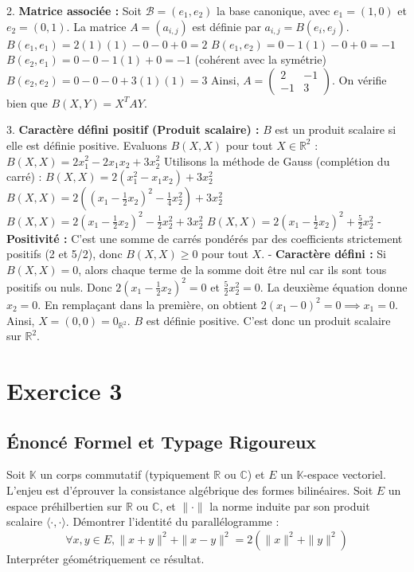 \documentclass[11pt,a4paper]{report}
\begin{document}
2. \textbf{Matrice associée :}
   Soit $\mathcal{B} = (e_1, e_2)$ la base canonique, avec $e_1 = (1, 0)$ et $e_2 = (0, 1)$.
   La matrice $A = (a_{i,j})$ est définie par $a_{i,j} = B(e_i, e_j)$.
   $B(e_1, e_1) = 2(1)(1) - 0 - 0 + 0 = 2$
   $B(e_1, e_2) = 0 - 1(1) - 0 + 0 = -1$
   $B(e_2, e_1) = 0 - 0 - 1(1) + 0 = -1$ (cohérent avec la symétrie)
   $B(e_2, e_2) = 0 - 0 - 0 + 3(1)(1) = 3$
   Ainsi, $A = \begin{pmatrix} 2 & -1 \\ -1 & 3 \end{pmatrix}$.
   On vérifie bien que $B(X, Y) = X^T A Y$.

3. \textbf{Caractère défini positif (Produit scalaire) :}
   $B$ est un produit scalaire si elle est définie positive. Evaluons $B(X, X)$ pour tout $X \in \mathbb{R}^2$ :
   $B(X, X) = 2x_1^2 - 2x_1x_2 + 3x_2^2$
   Utilisons la méthode de Gauss (complétion du carré) :
   $B(X, X) = 2(x_1^2 - x_1x_2) + 3x_2^2$
   $B(X, X) = 2( (x_1 - \frac{1}{2}x_2)^2 - \frac{1}{4}x_2^2 ) + 3x_2^2$
   $B(X, X) = 2(x_1 - \frac{1}{2}x_2)^2 - \frac{1}{2}x_2^2 + 3x_2^2$
   $B(X, X) = 2(x_1 - \frac{1}{2}x_2)^2 + \frac{5}{2}x_2^2$
   - \textbf{Positivité :} C'est une somme de carrés pondérés par des coefficients strictement positifs (2 et 5/2), donc $B(X, X) \ge 0$ pour tout $X$.
   - \textbf{Caractère défini :} Si $B(X, X) = 0$, alors chaque terme de la somme doit être nul car ils sont tous positifs ou nuls.
     Donc $2(x_1 - \frac{1}{2}x_2)^2 = 0$ et $\frac{5}{2}x_2^2 = 0$.
     La deuxième équation donne $x_2 = 0$.
     En remplaçant dans la première, on obtient $2(x_1 - 0)^2 = 0 \implies x_1 = 0$.
     Ainsi, $X = (0, 0) = 0_{\mathbb{R}^2}$.
   $B$ est définie positive. C'est donc un produit scalaire sur $\mathbb{R}^2$.


\section{Exercice 3}


\subsection*{Énoncé Formel et Typage Rigoureux}
Soit $\mathbb{K}$ un corps commutatif (typiquement $\mathbb{R}$ ou $\mathbb{C}$) et $E$ un $\mathbb{K}$-espace vectoriel. L'enjeu est d'éprouver la consistance algébrique des formes bilinéaires.
Soit $E$ un espace préhilbertien sur $\mathbb{R}$ ou $\mathbb{C}$, et $\| \cdot \|$ la norme induite par son produit scalaire $\langle \cdot, \cdot \rangle$.
Démontrer l'identité du parallélogramme :
$$\forall x, y \in E, \|x + y\|^2 + \|x - y\|^2 = 2(\|x\|^2 + \|y\|^2)$$
Interpréter géométriquement ce résultat.
\end{document}
